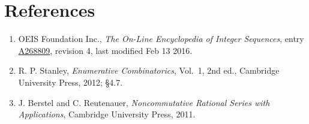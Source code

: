 \documentclass[11pt]{article}
\theoremstyle{definition}
\begin{document}
\section{References}

\begin{enumerate}

\item OEIS Foundation Inc., \emph{The On-Line Encyclopedia of Integer Sequences}, entry \href{https://oeis.org/A268809}{A268809}, revision 4, last modified Feb 13 2016.

\item R. P. Stanley, \emph{Enumerative Combinatorics}, Vol.~1, 2nd ed., Cambridge University Press, 2012; \S4.7.

\item J. Berstel and C. Reutenauer, \emph{Noncommutative Rational Series with Applications}, Cambridge University Press, 2011.

\end{enumerate}
\end{document}
